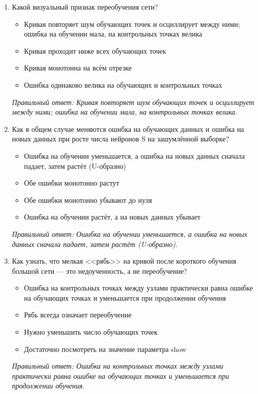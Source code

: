 \begin{enumerate}[label=\textbf{\arabic*.}, leftmargin=0pt, itemsep=1.2em]
\item Какой визуальный признак переобучения сети?
\begin{itemize}[label=$\square$, leftmargin=1.5cm, itemsep=0.2em, topsep=0.3em]
\item Кривая повторяет шум обучающих точек и осциллирует между ними; ошибка на обучении мала, на контрольных точках велика
\item Кривая проходит ниже всех обучающих точек
\item Кривая монотонна на всём отрезке
\item Ошибка одинаково велика на обучающих и контрольных точках
\end{itemize}
{\small\textit{Правильный ответ: Кривая повторяет шум обучающих точек и осциллирует между ними; ошибка на обучении мала, на контрольных точках велика.}}

\item Как в общем случае меняются ошибка на обучающих данных и ошибка на новых данных при росте числа нейронов S на зашумлённой выборке?
\begin{itemize}[label=$\square$, leftmargin=1.5cm, itemsep=0.2em, topsep=0.3em]
\item Ошибка на обучении уменьшается, а ошибка на новых данных сначала падает, затем растёт (U-образно)
\item Обе ошибки монотонно растут
\item Обе ошибки монотонно убывают до нуля
\item Ошибка на обучении растёт, а на новых данных убывает
\end{itemize}
{\small\textit{Правильный ответ: Ошибка на обучении уменьшается, а ошибка на новых данных сначала падает, затем растёт (U-образно).}}

\item Как узнать, что мелкая <<рябь>> на кривой после короткого обучения большой сети — это недоученность, а не переобучение?
\begin{itemize}[label=$\square$, leftmargin=1.5cm, itemsep=0.2em, topsep=0.3em]
\item Ошибка на контрольных точках между узлами практически равна ошибке на обучающих точках и уменьшается при продолжении обучения
\item Рябь всегда означает переобучение
\item Нужно уменьшить число обучающих точек
\item Достаточно посмотреть на значение параметра show
\end{itemize}
{\small\textit{Правильный ответ: Ошибка на контрольных точках между узлами практически равна ошибке на обучающих точках и уменьшается при продолжении обучения.}}


\end{enumerate}
